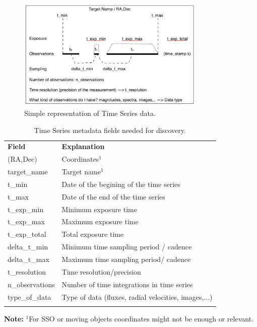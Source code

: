 \documentclass[11pt,a4paper]{ivoa}
\begin{document}
\begin{figure}[hbt]

\begin{center}
  \includegraphics[width=0.8\textwidth]{figs/fig1.png}
\caption{Simple representation of Time Series data.}
\label{fig:time-series}
\end{center}
\end{figure}

\begin{table}[hb]
  \begin{center}
  \caption{Time Series metadata fields needed for discovery.}
  \label{tab:fields}
    \begin{tabular}{p{}p{}}
      \sptablerule
      \textbf{Field}  & \textbf{Explanation}                        \\\sptablerule
      (RA,Dec)        & Coordinates$^1$                             \\
      target\_name    & Target name$^1$                             \\
      t\_min          & Date of the begining of the time series  \\
      t\_max          & Date of the end of the time series          \\
      t\_exp\_min     & Minimum exposure time                       \\
      t\_exp\_max     & Maximum exposure time                       \\
      t\_exp\_total   & Total exposure time                         \\
      delta\_t\_min   & Minimum time sampling period / cadence             \\
      delta\_t\_max   & Maximum time sampling period/ cadence             \\
      t\_resolution   & Time resolution/precision                   \\
      n\_observations & Number of time integrations  in time series         \\
      type\_of\_data  & Type of data (fluxes, radial velocities, images,...)\\
      \sptablerule
    \end{tabular}
  \end{center}
  \textbf{Note:} $^1$For SSO or moving objects coordinates might not be enough or relevant.
\end{table}
\end{document}
